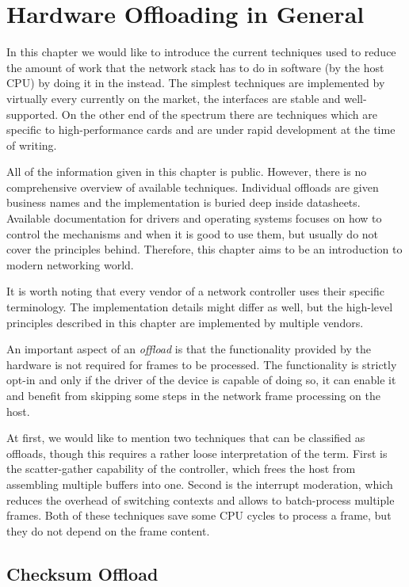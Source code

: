\chapter{Hardware Offloading in General}
\label{chap:offload}

In this chapter we would like to introduce the current techniques used to reduce
the amount of work that the network stack has to do in software (by the host CPU)
by doing it in the  instead. The simplest techniques are implemented by
virtually every  currently on the market, the interfaces are stable and
well-supported. On the other end of the spectrum there are techniques which
are specific to high-performance cards and are under rapid development at the
time of writing.

All of the information given in this chapter is public. However, there is no
comprehensive overview of available techniques. Individual offloads are given
business names and the implementation is buried deep inside datasheets.
Available documentation for drivers and operating systems focuses on how to
control the mechanisms and when it is good to use them, but usually do not
cover the principles behind. Therefore, this chapter aims to be an introduction
to modern networking world.

It is worth noting that every vendor of a network controller uses their
specific terminology. The implementation details might differ as well, but the
high-level principles described in this chapter are implemented by multiple
 vendors.

An important aspect of an \emph{offload} is that the functionality provided by
the hardware is not required for frames to be processed. The functionality is
strictly opt-in and only if the driver of the device is capable of doing so, it
can enable it and benefit from skipping some steps in the network frame
processing on the host.

At first, we would like to mention two techniques that can be
classified as offloads, though this requires a rather loose interpretation of the
term. First is the scatter-gather capability of the controller, which frees the
host from assembling multiple buffers into one. Second is the interrupt
moderation, which reduces the overhead of switching contexts and allows to
batch-process multiple frames. Both of these techniques save some CPU cycles to
process a frame, but they do not depend on the frame content.

\section{Checksum Offload}

